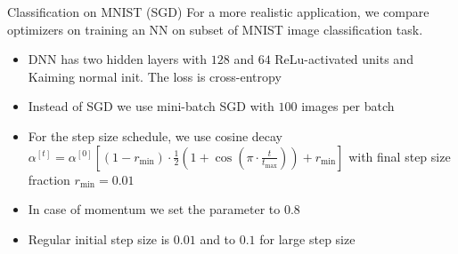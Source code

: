 \documentclass[11pt,compress,t,notes=noshow, xcolor=table]{beamer}
\begin{document}
\begin{vbframe}{Classification on MNIST (SGD)}
For a more realistic application, we compare optimizers on training an NN on subset of MNIST image classification task. 
\medskip
\begin{itemize}
     \setlength{\itemsep}{1.2em} 
    \item DNN has two hidden layers with $128$ and $64$ ReLu-activated units and Kaiming normal init. The loss is cross-entropy
    \item Instead of SGD we use mini-batch SGD with $100$ images per batch
    \item For the step size schedule, we use cosine decay $\alpha^{[t]} = \alpha^{[0]} \left[(1-r_{\text{min}}) \cdot \frac{1}{2}\left(1 + \cos\left(\pi \cdot \frac{t}{t_{\text{max}}}\right)\right) + r_{\text{min}}\right]$ with final step size fraction $r_{\text{min}}=0.01$
    \item In case of momentum we set the parameter to $0.8$
    \item Regular initial step size is $0.01$ and to $0.1$ for large step size
\end{itemize}
\end{vbframe}
\end{document}
